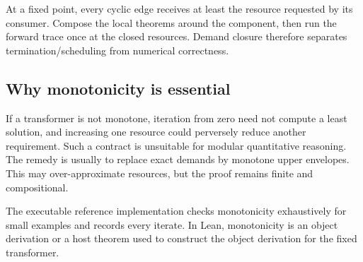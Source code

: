 At a fixed point, every cyclic edge receives at least the resource requested by its consumer.  Compose the local theorems around the component, then run the forward trace once at the closed resources.  Demand closure therefore separates termination/scheduling from numerical correctness.

\subsection{Why monotonicity is essential}

If a transformer is not monotone, iteration from zero need not compute a least solution, and increasing one resource could perversely reduce another requirement.  Such a contract is unsuitable for modular quantitative reasoning.  The remedy is usually to replace exact demands by monotone upper envelopes.  This may over-approximate resources, but the proof remains finite and compositional.

The executable reference implementation checks monotonicity exhaustively for small examples and records every iterate.  In Lean, monotonicity is an object derivation or a host theorem used to construct the object derivation for the fixed transformer.
